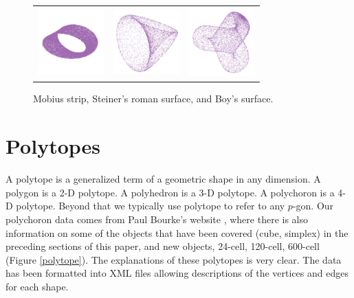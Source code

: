 \begin{figure}[ht]
\centering
\begin{tabular}{ccc}
\includegraphics[width=1in]{fig/mobius.pdf}&\includegraphics[width=1in]{fig/roman.pdf}&\includegraphics[width=1in]{fig/boy-surface.pdf}
\end{tabular}
\caption{Mobius strip, Steiner's roman surface, and Boy's surface.}
\label{klein}
\end{figure}

\section{Polytopes}

A polytope is a generalized term of a geometric shape in any
dimension. A polygon is a 2-D polytope. A polyhedron is a 3-D
polytope. A polychoron is a 4-D polytope. Beyond that we typically use
polytope to refer to any $p$-gon.  Our polychoron data comes from Paul
Bourke's website \citep{PBPlatonic}, where there is also information on some of the
objects that have been covered (cube, simplex) in the preceding sections of this paper, and new
objects, 24-cell, 120-cell, 600-cell (Figure \ref{polytope}).  The explanations of these
polytopes is very clear. The data has been formatted into XML files
allowing descriptions of the vertices and edges for each shape.

